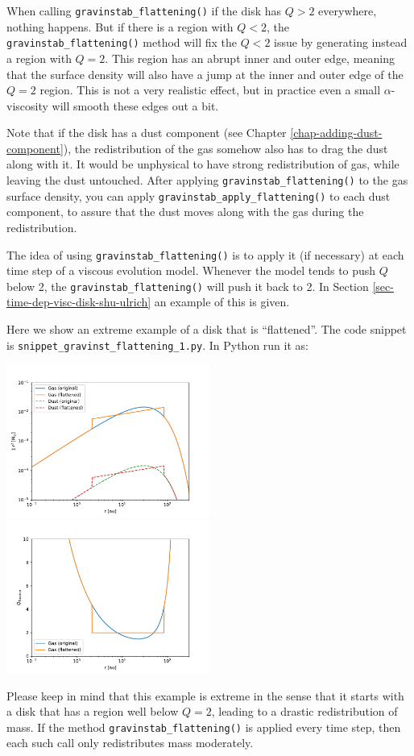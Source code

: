 \documentclass{book}
\newcommand{\code}[1]{{\small\tt #1}}
\begin{document}
When calling \code{gravinstab\_flattening()} if the disk has $Q>2$ everywhere,
nothing happens. But if there is a region with $Q<2$, the
\code{gravinstab\_flattening()} method will fix the $Q<2$ issue by generating
instead a region with $Q=2$. This region has an abrupt inner and outer edge,
meaning that the surface density will also have a jump at the inner and outer
edge of the $Q=2$ region. This is not a very realistic effect, but in practice
even a small $\alpha$-viscosity will smooth these edges out a bit.

Note that if the disk has a dust component (see Chapter
\ref{chap-adding-dust-component}), the redistribution of the gas somehow also
has to drag the dust along with it. It would be unphysical to have strong
redistribution of gas, while leaving the dust untouched. After applying
\code{gravinstab\_flattening()} to the gas surface density, you can apply
\code{gravinstab\_apply\_flattening()} to each dust component, to assure that
the dust moves along with the gas during the redistribution.

The idea of using \code{gravinstab\_flattening()} is to apply it (if necessary)
at each time step of a viscous evolution model. Whenever the model tends to
push $Q$ below 2, the \code{gravinstab\_flattening()} will push it back to 2.
In Section \ref{sec-time-dep-visc-disk-shu-ulrich} an example of this is
given.

Here we show an extreme example of a disk that is ``flattened''. 
The code snippet is
\code{snippet\_gravinst\_flattening\_1.py}. In Python run it as:
\begin{codebox}
\end{codebox}
\centerline{\includegraphics[width=0.5\textwidth]{../snippets/fig_snippet_gravinst_flattening_1_1.pdf}
\includegraphics[width=0.5\textwidth]{../snippets/fig_snippet_gravinst_flattening_1_2.pdf}}
Please keep in mind that this example is extreme in the sense that it starts
with a disk that has a region well below $Q=2$, leading to a drastic redistribution
of mass. If the method \code{gravinstab\_flattening()} is applied every time step,
then each such call only redistributes mass moderately.
\end{document}
